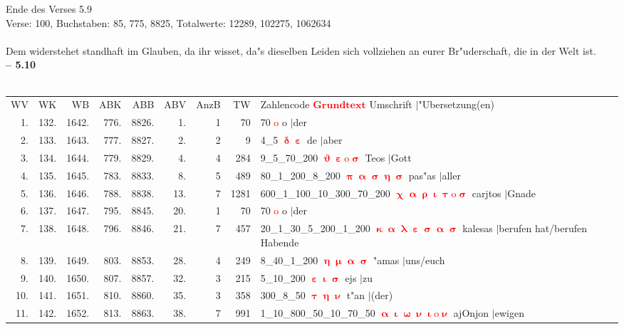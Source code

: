 \documentclass[a4paper,10pt,landscape]{article}
\begin{document}
Ende des Verses 5.9\\
Verse: 100, Buchstaben: 85, 775, 8825, Totalwerte: 12289, 102275, 1062634\\
\\
Dem widerstehet standhaft im Glauben, da ihr wisset, da"s dieselben Leiden sich vollziehen an eurer Br"uderschaft, die in der Welt ist.\\
\newpage 
{\bf -- 5.10}\\
\medskip \\
\begin{tabular}{rrrrrrrrp{120mm}}
WV&WK&WB&ABK&ABB&ABV&AnzB&TW&Zahlencode \textcolor{red}{$\boldsymbol{Grundtext}$} Umschrift $|$"Ubersetzung(en)\\
1.&132.&1642.&776.&8826.&1.&1&70&70 \textcolor{red}{$\boldsymbol{\mathrm{o}}$} o $|$der\\
2.&133.&1643.&777.&8827.&2.&2&9&4\_5 \textcolor{red}{$\boldsymbol{\updelta\upepsilon}$} de $|$aber\\
3.&134.&1644.&779.&8829.&4.&4&284&9\_5\_70\_200 \textcolor{red}{$\boldsymbol{\upvartheta\upepsilon\mathrm{o}\upsigma}$} Teos $|$Gott\\
4.&135.&1645.&783.&8833.&8.&5&489&80\_1\_200\_8\_200 \textcolor{red}{$\boldsymbol{\uppi\upalpha\upsigma\upeta\upsigma}$} pas"as $|$aller\\
5.&136.&1646.&788.&8838.&13.&7&1281&600\_1\_100\_10\_300\_70\_200 \textcolor{red}{$\boldsymbol{\upchi\upalpha\uprho\upiota\uptau\mathrm{o}\upsigma}$} carjtos $|$Gnade\\
6.&137.&1647.&795.&8845.&20.&1&70&70 \textcolor{red}{$\boldsymbol{\mathrm{o}}$} o $|$der\\
7.&138.&1648.&796.&8846.&21.&7&457&20\_1\_30\_5\_200\_1\_200 \textcolor{red}{$\boldsymbol{\upkappa\upalpha\uplambda\upepsilon\upsigma\upalpha\upsigma}$} kalesas $|$berufen hat/berufen Habende\\
8.&139.&1649.&803.&8853.&28.&4&249&8\_40\_1\_200 \textcolor{red}{$\boldsymbol{\upeta\upmu\upalpha\upsigma}$} "amas $|$uns/euch\\
9.&140.&1650.&807.&8857.&32.&3&215&5\_10\_200 \textcolor{red}{$\boldsymbol{\upepsilon\upiota\upsigma}$} ejs $|$zu\\
10.&141.&1651.&810.&8860.&35.&3&358&300\_8\_50 \textcolor{red}{$\boldsymbol{\uptau\upeta\upnu}$} t"an $|$(der)\\
11.&142.&1652.&813.&8863.&38.&7&991&1\_10\_800\_50\_10\_70\_50 \textcolor{red}{$\boldsymbol{\upalpha\upiota\upomega\upnu\upiota\mathrm{o}\upnu}$} ajOnjon $|$ewigen\\

\end{tabular}
\end{document}
